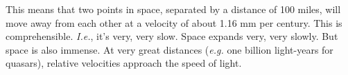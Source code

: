 \documentclass{report}
\begin{document}
This means that two points in space, separated by a distance of 100 miles,
will move away from each other at a velocity of about 1.16 mm per century.
This is comprehensible.  \emph{I.e.}, it's very, very slow.
Space expands very, very slowly.
But space is also immense.
At very great distances (\emph{e.g.} one billion light-years for quasars),
relative velocities approach the speed of light.
\end{document}
